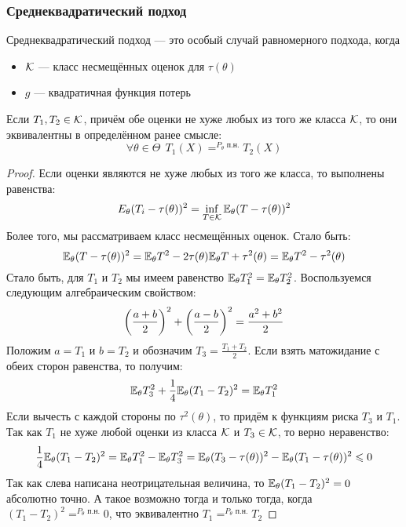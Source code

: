 \subsubsection{Среднеквадратический подход}

\begin{note}
	Среднеквадратический подход --- это особый случай равномерного подхода, когда
	\begin{itemize}
		\item $\mathcal{K}$ --- класс несмещённых оценок для $\tau(\theta)$
		
		\item $g$ --- квадратичная функция потерь
	\end{itemize}
\end{note}

\begin{proposition}
	Если $T_1, T_2 \in \mathcal{K}$, причём обе оценки не хуже любых из того же класса $\mathcal{K}$, то они эквивалентны в определённом ранее смысле:
	\[
		\forall \theta \in \Theta\ \ T_1(X) =^{P_\theta\text{ п.н.}} T_2(X)
	\]
\end{proposition}

\begin{proof}
	Если оценки являются не хуже любых из того же класса, то выполнены равенства:
	\[
		E_\theta (T_i - \tau(\theta))^2 = \inf_{T \in \mathcal{K}} \mathbb{E}_\theta (T - \tau(\theta))^2
	\]
	Более того, мы рассматриваем класс несмещённых оценок. Стало быть:
	\[
		\mathbb{E}_\theta (T - \tau(\theta))^2 = \mathbb{E}_\theta T^2 - 2\tau(\theta)\mathbb{E}_\theta T + \tau^2(\theta) = \mathbb{E}_\theta T^2 - \tau^2(\theta)
	\]
	Стало быть, для $T_1$ и $T_2$ мы имеем равенство $\mathbb{E}_\theta T_1^2 = \mathbb{E}_\theta T_2^2$. Воспользуемся следующим алгебраическим свойством:
	\[
		\left(\frac{a + b}{2}\right)^2 + \left(\frac{a - b}{2}\right)^2 = \frac{a^2 + b^2}{2}
	\]
	Положим $a = T_1$ и $b = T_2$ и обозначим $T_3 = \frac{T_1 + T_2}{2}$. Если взять матожидание с обеих сторон равенства, то получим:
	\[
		\mathbb{E}_\theta T_3^2 + \frac{1}{4}\mathbb{E}_\theta (T_1 - T_2)^2 = \mathbb{E}_\theta T_1^2
	\]
	Если вычесть с каждой стороны по $\tau^2(\theta)$, то придём к функциям риска $T_3$ и $T_1$. Так как $T_1$ не хуже любой оценки из класса $\mathcal{K}$ и $T_3 \in \mathcal{K}$, то верно неравенство:
	\[
		\frac{1}{4}\mathbb{E}_\theta (T_1 - T_2)^2 = \mathbb{E}_\theta T_1^2 - \mathbb{E}_\theta T_3^2 = \mathbb{E}_\theta (T_3 - \tau(\theta))^2 - \mathbb{E}_\theta (T_1 - \tau(\theta))^2 \leqslant 0
	\]
	Так как слева написана неотрицательная величина, то $\mathbb{E}_\theta (T_1 - T_2)^2 = 0$ абсолютно точно. А такое возможно тогда и только тогда, когда $(T_1 - T_2)^2 =^{P_\theta\text{ п.н.}} 0$, что эквивалентно $T_1 =^{P_\theta\text{ п.н.}} T_2$
\end{proof}

